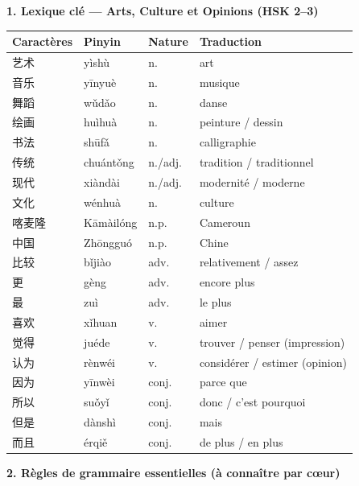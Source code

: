 \documentclass[11pt]{article}
\begin{document}
\begin{bilan}

\textbf{1. Lexique clé — Arts, Culture et Opinions (HSK 2--3)}

\begin{center}
\begin{tabularx}{\linewidth}{|X|X|X|X|}
\hline
\rowcolor{popblueL} \textbf{Caractères} & \textbf{Pinyin} & \textbf{Nature} & \textbf{Traduction} \\
\hline
艺术 & yìshù & n. & art \\
音乐 & yīnyuè & n. & musique \\
舞蹈 & wǔdǎo & n. & danse \\
绘画 & huìhuà & n. & peinture / dessin \\
书法 & shūfǎ & n. & calligraphie \\
传统 & chuántǒng & n./adj. & tradition / traditionnel \\
现代 & xiàndài & n./adj. & modernité / moderne \\
文化 & wénhuà & n. & culture \\
喀麦隆 & Kāmàilóng & n.p. & Cameroun \\
中国 & Zhōngguó & n.p. & Chine \\
比较 & bǐjiào & adv. & relativement / assez \\
更 & gèng & adv. & encore plus \\
最 & zuì & adv. & le plus \\
喜欢 & xǐhuan & v. & aimer \\
觉得 & juéde & v. & trouver / penser (impression) \\
认为 & rènwéi & v. & considérer / estimer (opinion) \\
因为 & yīnwèi & conj. & parce que \\
所以 & suǒyǐ & conj. & donc / c'est pourquoi \\
但是 & dànshì & conj. & mais \\
而且 & érqiě & conj. & de plus / en plus \\
\hline
\end{tabularx}
\end{center}

\textbf{2. Règles de grammaire essentielles (à connaître par cœur)}


\end{bilan}
\end{document}
